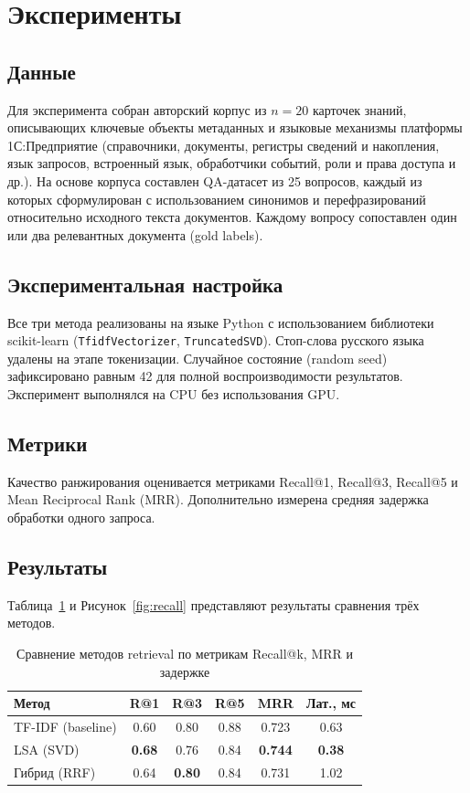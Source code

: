 \documentclass[nonacm, sigconf]{acmart}
\begin{document}
\section{Эксперименты}

\subsection{Данные}

Для эксперимента собран авторский корпус из $n=20$ карточек знаний, описывающих ключевые объекты метаданных и языковые механизмы платформы 1С:Предприятие (справочники, документы, регистры сведений и накопления, язык запросов, встроенный язык, обработчики событий, роли и права доступа и др.). На основе корпуса составлен QA-датасет из 25 вопросов, каждый из которых сформулирован с использованием синонимов и перефразирований относительно исходного текста документов. Каждому вопросу сопоставлен один или два релевантных документа (gold labels).

\subsection{Экспериментальная настройка}

Все три метода реализованы на языке Python с использованием библиотеки scikit-learn (\texttt{TfidfVectorizer}, \texttt{TruncatedSVD}). Стоп-слова русского языка удалены на этапе токенизации. Случайное состояние (random seed) зафиксировано равным 42 для полной воспроизводимости результатов. Эксперимент выполнялся на CPU без использования GPU.

\subsection{Метрики}

Качество ранжирования оценивается метриками Recall@1, Recall@3, Recall@5 и Mean Reciprocal Rank (MRR). Дополнительно измерена средняя задержка обработки одного запроса.

\subsection{Результаты}

Таблица~\ref{tab:results} и Рисунок~\ref{fig:recall} представляют результаты сравнения трёх методов.

\begin{table}[t]
\centering
\caption{Сравнение методов retrieval по метрикам Recall@k, MRR и задержке}
\label{tab:results}
\begin{tabular}{lccccc}
\toprule
Метод & R@1 & R@3 & R@5 & MRR & Лат., мс \\
\midrule
TF-IDF (baseline) & 0.60 & 0.80 & 0.88 & 0.723 & 0.63 \\
LSA (SVD) & \textbf{0.68} & 0.76 & 0.84 & \textbf{0.744} & \textbf{0.38} \\
Гибрид (RRF) & 0.64 & \textbf{0.80} & 0.84 & 0.731 & 1.02 \\
\bottomrule
\end{tabular}
\end{table}
\end{document}
